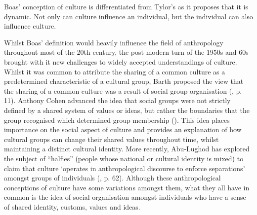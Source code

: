 Boas’ conception of culture is differentiated from Tylor’s as it proposes that it is dynamic. Not only can culture influence an individual, but the individual can also influence culture.

Whilst Boas’ definition would heavily influence the field of anthropology throughout most of the 20th-century, the post-modern turn of the 1950s and 60s brought with it new challenges to widely accepted understandings of culture. Whilst it was common to attribute the sharing of a common culture as a predetermined characteristic of a cultural group, Barth proposed the view that the sharing of a common culture was a result of social group organisation (\cite{barth1969}, p. 11). Anthony Cohen advanced the idea that social groups were not strictly defined by a shared system of values or ideas, but rather the boundaries that the group recognised which determined group membership (\cite{cohen1995}). This idea places importance on the social aspect of culture and provides an explanation of how cultural groups can change their shared values throughout time, whilst maintaining a distinct cultural identity. More recently, Abu-Lughod has explored the subject of “halfies” (people whose national or cultural identity is mixed) to claim that culture ‘operates in anthropological discourse to enforce separations’ amongst groups of individuals (\cite{abu-lughod2008}, p. 62). Although these anthropological conceptions of culture have some variations amongst them, what they all have in common is the idea of social organisation amongst individuals who have a sense of shared identity, customs, values and ideas.

